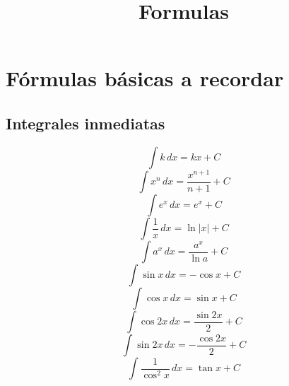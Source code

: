 \documentclass[a4paper,12pt,numbers=noenddot]{scrreprt}
\begin{document}

\title{Formulas}

\section*{Fórmulas básicas a recordar}
\subsection*{Integrales inmediatas}
    \begin{multicols}{2} %
        \begin{equation*}
            \int k \, dx = kx + C
        \end{equation*}
        \begin{equation*}
            \int x^n \, dx = \frac{x^{n+1}}{n+1} + C
        \end{equation*}
        \begin{equation*}
            \int e^x \, dx = e^x + C
        \end{equation*}
        \begin{equation*}
            \int \frac{1}{x} \, dx = \ln |x| + C
        \end{equation*}
        \begin{equation*}
            \int a^x \, dx = \frac{a^x}{\ln a} + C
        \end{equation*}
        \begin{equation*}   
            \int \sin x \, dx = -\cos x + C
        \end{equation*}
        \begin{equation*}
            \int \cos x \, dx = \sin x + C
        \end{equation*}
        \begin{equation*}
            \int \cos 2x \, dx = \frac{\sin 2x}{2}  + C
        \end{equation*}
        \begin{equation*}
            \int \sin 2x \, dx = -\frac{\cos 2x}{2} + C 
        \end{equation*}
        \begin{equation*}
            \int \frac{1}{\cos^2 x} \, dx = \tan x + C
        \end{equation*}
        \begin{equation*}

\end{equation*}
\end{multicols}
\end{document}
